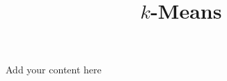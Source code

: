 \title{$k$-Means}
\label{chp:k-means}
\author{}
\institute{}
\maketitle


Add your content here




